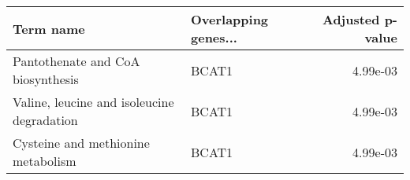 \begin{tabular}{llr}
\toprule
                                 Term name & Overlapping genes... &  Adjusted p-value \\
\midrule
         Pantothenate and CoA biosynthesis &                BCAT1 &          4.99e-03 \\
Valine, leucine and isoleucine degradation &                BCAT1 &          4.99e-03 \\
        Cysteine and methionine metabolism &                BCAT1 &          4.99e-03 \\
\bottomrule
\end{tabular}
